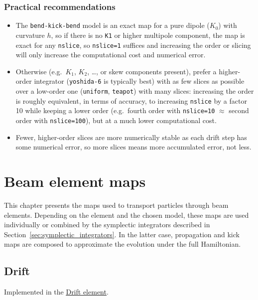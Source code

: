 \subsection{Practical recommendations}

\begin{itemize}
\item The \texttt{bend-kick-bend} model is an exact map for a pure dipole ($K_0$)
    with curvature $h$, so if there is no \texttt{K1} or higher multipole component,
    the map is exact for any \texttt{nslice}, so \texttt{nslice=1} suffices and
    increasing the order or slicing will only increase the computational cost and
    numerical error.
\item Otherwise (e.g.\ $K_1$, $K_2$, \dots, or skew components present),
    prefer a higher-order integrator (\texttt{yoshida-6} is typically best)
    with as few slices as possible over a low-order one
    (\texttt{uniform}, \texttt{teapot}) with many slices: increasing the
    order is roughly equivalent, in terms of accuracy, to increasing
    \texttt{nslice} by a factor 10 while keeping a lower order (e.g.\
    fourth order with \texttt{nslice=10} $\approx$ second order with
    \texttt{nslice=100}), but at a much lower computational cost.
\item Fewer, higher-order slices are more numerically stable as each
    drift step has some numerical error, so more slices means more
    accumulated error, not less.
\end{itemize}

\FloatBarrier



\chapter{Beam element maps}
\label{chapter:beam_element_maps}

This chapter presents the maps used to transport particles through beam
elements. Depending on the element and the chosen model, these maps are
used individually or combined by the symplectic integrators described in
Section~\ref{sec:symplectic_integrators}. In the latter case, propagation
and kick maps are composed to approximate the evolution under the full
Hamiltonian.

\section{Drift}

Implemented in the \href{https://xsuite.readthedocs.io/en/latest/apireference.html#drift}{\underline{Drift element}}.
~\\

